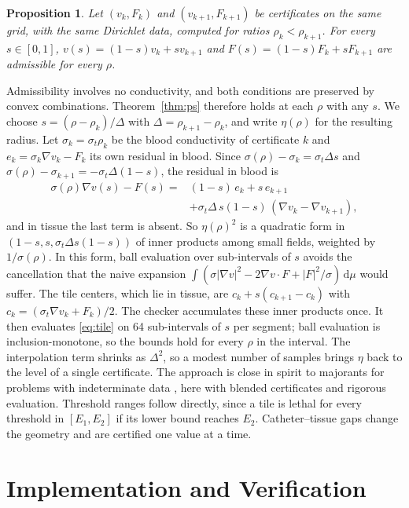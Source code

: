 \documentclass[11pt]{article}
\newtheorem{proposition}{Proposition}
\newcommand{\dmu}{\,\mathrm{d}\mu}
\begin{document}
\begin{proposition}
Let $(v_k,F_k)$ and $(v_{k+1},F_{k+1})$ be certificates on the same grid, with
the same Dirichlet data, computed for ratios $\rho_k<\rho_{k+1}$. For every
$s\in[0,1]$, $v(s)=(1-s)v_k+s v_{k+1}$ and $F(s)=(1-s)F_k+sF_{k+1}$ are
admissible for every $\rho$.
\end{proposition}
Admissibility involves no conductivity, and both conditions are preserved by
convex combinations. Theorem~\ref{thm:ps} therefore holds at each $\rho$ with
any $s$. We choose $s=(\rho-\rho_k)/\Delta$ with $\Delta=\rho_{k+1}-\rho_k$, and
write $\eta(\rho)$ for the resulting radius. Let $\sigma_k=\sigma_t\rho_k$ be
the blood conductivity of certificate $k$ and $e_k=\sigma_k\nabla v_k-F_k$ its
own residual in blood. Since $\sigma(\rho)-\sigma_k=\sigma_t\Delta s$ and
$\sigma(\rho)-\sigma_{k+1}=-\sigma_t\Delta(1-s)$, the residual in blood is
\begin{equation}
\begin{aligned}
\sigma(\rho)\nabla v(s)-F(s)={}&(1-s)\,e_k+s\,e_{k+1}\\
&+\sigma_t\Delta\,s(1-s)\,(\nabla v_k-\nabla v_{k+1}),
\end{aligned}
\end{equation}
and in tissue the last term is absent. So $\eta(\rho)^2$ is a quadratic form in
$(1-s,s,\sigma_t\Delta s(1-s))$ of inner products among small fields, weighted
by $1/\sigma(\rho)$. In this form, ball evaluation over sub-intervals of $s$
avoids the cancellation that the naive expansion
$\int(\sigma|\nabla v|^2-2\nabla v\cdot F+|F|^2/\sigma)\dmu$ would suffer. The tile centers, which lie in tissue, are $c_k+s(c_{k+1}-c_k)$ with
$c_k=(\sigma_t\nabla v_k+F_k)/2$. The checker accumulates these inner products
once. It then evaluates \eqref{eq:tile} on 64 sub-intervals of $s$ per
segment; ball evaluation is inclusion-monotone, so the bounds hold for every
$\rho$ in the interval. The interpolation term shrinks as $\Delta^2$, so a
modest number of samples brings $\eta$ back to the level of a single
certificate. The approach is close in spirit to majorants for problems with
indeterminate data \cite{mali2014}, here with blended certificates and rigorous
evaluation. Threshold ranges follow directly, since a tile is lethal for every
threshold in $[E_1,E_2]$ if its lower bound reaches $E_2$. Catheter--tissue
gaps change the geometry and are certified one value at a time.

\section{Implementation and Verification}\label{sec:impl}
\end{document}
